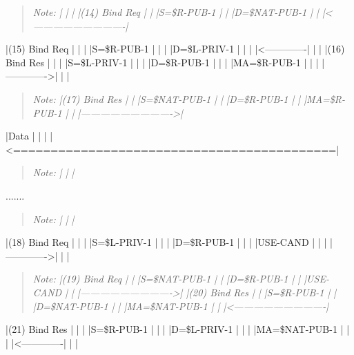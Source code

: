 \documentclass{article}
\begin{document}
\begin{quote}
\textit{Note: |              |              | |(14) Bind Req |              | |S=\$R-PUB-1    |              | |D=\$NAT-PUB-1  |              | |<----------------------------|}
\end{quote}

|(15) Bind Req |              |              | |S=\$R-PUB-1    |              |              | |D=\$L-PRIV-1   |              |              | |<-------------|              |              | |(16) Bind Res |              |              | |S=\$L-PRIV-1   |              |              | |D=\$R-PUB-1    |              |              | |MA=\$R-PUB-1   |              |              | |------------->|              |              |

\begin{quote}
\textit{Note: |(17) Bind Res |              | |S=\$NAT-PUB-1  |              | |D=\$R-PUB-1    |              | |MA=\$R-PUB-1   |              | |---------------------------->|}
\end{quote}

|Data          |              |              | |<===========================================|

\begin{quote}
\textit{Note: |              |              |}
\end{quote}

.......

\begin{quote}
\textit{Note: |              |              |}
\end{quote}

|(18) Bind Req |              |              | |S=\$L-PRIV-1   |              |              | |D=\$R-PUB-1    |              |              | |USE-CAND      |              |              | |------------->|              |              |

\begin{quote}
\textit{Note: |(19) Bind Req |              | |S=\$NAT-PUB-1  |              | |D=\$R-PUB-1    |              | |USE-CAND      |              | |---------------------------->| |(20) Bind Res |              | |S=\$R-PUB-1    |              | |D=\$NAT-PUB-1  |              | |MA=\$NAT-PUB-1 |              | |<----------------------------|}
\end{quote}

|(21) Bind Res |              |              | |S=\$R-PUB-1    |              |              | |D=\$L-PRIV-1   |              |              | |MA=\$NAT-PUB-1 |              |              | |<-------------|              |              |
\end{document}

